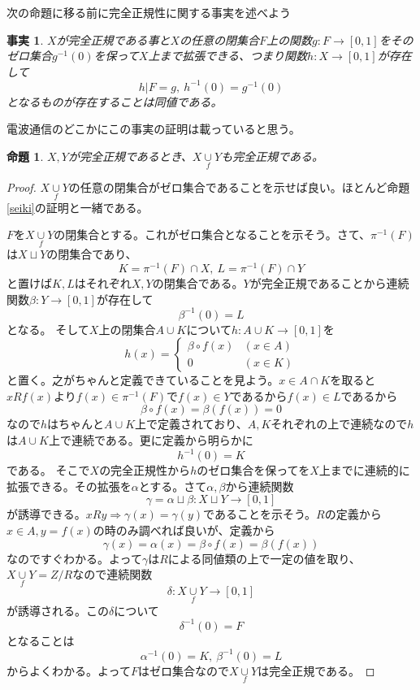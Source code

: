 \documentclass[leqno]{jsarticle}
\newtheorem{prop}[thm]{命題}
\newtheorem{fact}[thm]{事実}
\newcommand{\To}{\Longrightarrow}
\newcommand{\qt}[2]{#1/\! #2}
\newcommand{\al}{\alpha}
\newcommand{\be}{\beta}
\newcommand{\ga}{\gamma}
\newcommand{\main}{X\underset{f}{\cup} Y}
\begin{document}
次の命題に移る前に完全正規性に関する事実を述べよう
\begin{fact}
$X$が完全正規である事と$X$の任意の閉集合$F$上の関数$g:F\to [0,1]$をそのゼロ集合$g^{-1}(0)$を保って$X$上まで拡張できる、つまり関数$h:X\to[0,1]$が存在して
\[
h|F=g,\ h^{-1}(0)=g^{-1}(0)
\]
となるものが存在することは同値である。
\end{fact}
電波通信のどこかにこの事実の証明は載っていると思う。
\begin{prop}
$X,Y$が完全正規であるとき、$X\underset{f}{\cup} Y$も完全正規である。
\end{prop}
\begin{proof}
$\main$の任意の閉集合がゼロ集合であることを示せば良い。ほとんど命題\ref{seiki}の証明と一緒である。\par
$F$を$\main$の閉集合とする。これがゼロ集合となることを示そう。さて、$\pi^{-1}(F)$は$X\sqcup Y$の閉集合であり、
\[
K=\pi^{-1}(F)\cap X,\ L=\pi^{-1}(F)\cap Y
\]
と置けば$K,L$はそれぞれ$X,Y$の閉集合である。$Y$が完全正規であることから連続関数$\be:Y\to[0,1]$が存在して
\[
\be^{-1}(0)=L
\]
となる。
そして$X$上の閉集合$A\cup K$について$h:A\cup K\to[0,1]$を
\[
h(x)=
\begin{cases}
\be \circ f(x) & \text{$(x\in A)$}\\ 
0 & \text{$(x\in K)$}
\end{cases}
\]
と置く。之がちゃんと定義できていることを見よう。$x\in A\cap K$を取ると$xRf(x)$より$f(x)\in \pi^{-1}(F)$で$f(x)\in Y$であるから$f(x)\in L$であるから
\[
\be \circ f(x)=\be(f(x))=0
\]
なので$h$はちゃんと$A\cup K$上で定義されており、$A,K$それぞれの上で連続なので$h$は$A\cup K$上で連続である。更に定義から明らかに
\[
h^{-1}(0)=K
\]
である。
そこで$X$の完全正規性から$h$のゼロ集合を保ってを$X$上までに連続的に拡張できる。その拡張を$\al$とする。さて$\al,\be$から連続関数
\[
\ga=\al\sqcup \be:X\sqcup Y\to [0,1]
\]
が誘導できる。$xRy\To \ga(x)=\ga(y)$であることを示そう。$R$の定義から$x\in A,y=f(x)$の時のみ調べれば良いが、定義から
\[
\ga(x)=\al(x)=\be\circ f(x)=\be(f(x))
\]
なのですぐわかる。よって$\ga$は$R$による同値類の上で一定の値を取り、$\main=\qt{Z}{R}$なので連続関数
\[
\delta:\main\to [0,1]
\]
が誘導される。この$\delta$について
\[
\delta^{-1}(0)=F
\]
となることは
\[
\al^{-1}(0)=K,\ \be^{-1}(0)=L
\]
からよくわかる。よって$F$はゼロ集合なので$\main$は完全正規である。

\end{proof}
\end{document}
